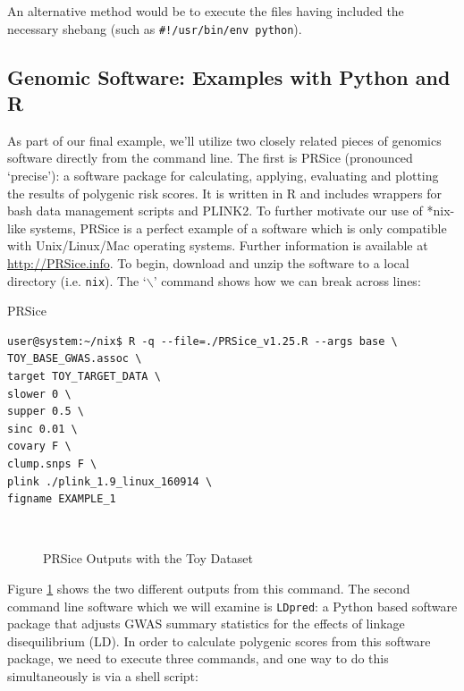 \documentclass[11pt]{article}
\begin{document}
\noindent
An alternative method would be to execute the files having included the necessary shebang (such as \texttt{\#!/usr/bin/env python}).

\subsection{Genomic Software: Examples with Python and R}\label{genomicsoftware}

As part of our final example, we'll utilize two closely related pieces of genomics software directly from the command line. The first is PRSice (pronounced ‘precise’): a software package for calculating, applying, evaluating and plotting the results of polygenic risk scores. It is written in R and includes wrappers for bash data management scripts and PLINK2. To further motivate our use of *nix-like systems, PRSice is a perfect example of a software which is only compatible with Unix/Linux/Mac operating systems. Further information is available at \href{http://PRSice.info}{http://PRSice.info}. To begin, download and unzip the software to a local directory (i.e. \texttt{nix}). The `\texttt{$\backslash$}' command shows how we can break across lines:\\

\begin{listing}[H]
\caption{PRSice}\vspace{-0.1in}
\begin{verbatim}
user@system:~/nix$ R -q --file=./PRSice_v1.25.R --args base \
TOY_BASE_GWAS.assoc \
target TOY_TARGET_DATA \
slower 0 \
supper 0.5 \
sinc 0.01 \
covary F \
clump.snps F \
plink ./plink_1.9_linux_160914 \
figname EXAMPLE_1
\end{verbatim}
\end{listing}

\begin{figure}[H]
\centering  
\caption{PRSice Outputs with the Toy Dataset}\label{PRSiceFigure}
\hspace{1in}
\\
\end{figure}

Figure \ref{PRSiceFigure} shows the two different outputs from this command. The second command line software which we will examine is \texttt{LDpred}: a Python based software package that adjusts GWAS summary statistics for the effects of linkage disequilibrium (LD). In order to calculate polygenic scores from this software package, we need to execute three commands, and one way to do this simultaneously is via a shell script:\\
\end{document}

